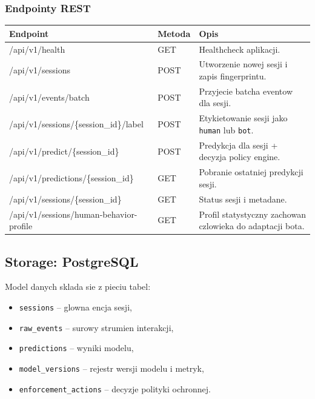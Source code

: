 \subsubsection{Endpointy REST}
\begin{longtable}{
  >{\ttfamily\footnotesize\raggedright\arraybackslash}p{}
  @{\hspace{1.0em}}
  >{\centering\arraybackslash}p{}
  @{\hspace{0.8em}}
  >{\raggedright\arraybackslash}p{}
}
\toprule
\textnormal{Endpoint} & \textnormal{Metoda} & \textnormal{Opis} \\
\midrule
\endhead
\textnormal{/api/v1/health} & GET & Healthcheck aplikacji. \\
\textnormal{/api/v1/sessions} & POST & Utworzenie nowej sesji i zapis fingerprintu. \\
\textnormal{/api/v1/events/batch} & POST & Przyjecie batcha eventow dla sesji. \\
\textnormal{/api/v1/sessions/\{session\_id\}/label} & POST & Etykietowanie sesji jako \texttt{human} lub \texttt{bot}. \\
\textnormal{/api/v1/predict/\{session\_id\}} & POST & Predykcja dla sesji + decyzja policy engine. \\
\textnormal{/api/v1/predictions/\{session\_id\}} & GET & Pobranie ostatniej predykcji sesji. \\
\textnormal{/api/v1/sessions/\{session\_id\}} & GET & Status sesji i metadane. \\
\textnormal{/api/v1/sessions/human-behavior-profile} & GET & Profil statystyczny zachowan czlowieka do adaptacji bota. \\
\bottomrule
\end{longtable}

\subsection{Storage: PostgreSQL}
Model danych sklada sie z pieciu tabel:
\begin{itemize}
  \item \texttt{sessions} -- glowna encja sesji,
  \item \texttt{raw\_events} -- surowy strumien interakcji,
  \item \texttt{predictions} -- wyniki modelu,
  \item \texttt{model\_versions} -- rejestr wersji modelu i metryk,
  \item \texttt{enforcement\_actions} -- decyzje polityki ochronnej.
\end{itemize}

